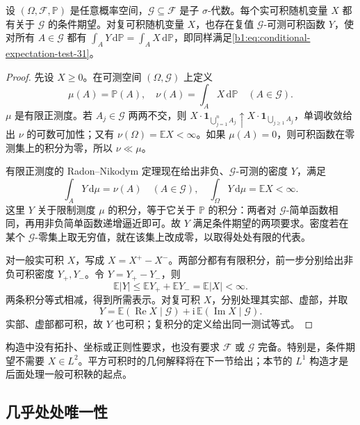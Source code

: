 \begin{theorem}[条件期望的存在性]\label{b1:thm:conditional-expectation-existence-31}
设 \((\Omega,\mathcal F,\mathbb P)\) 是任意概率空间，\(\mathcal G\subseteq\mathcal F\) 是子 \(\sigma\)-代数。每个实可积随机变量 \(X\) 都有关于 \(\mathcal G\) 的条件期望。对复可积随机变量 \(X\)，也存在复值 \(\mathcal G\)-可测可积函数 \(Y\)，使对所有 \(A\in\mathcal G\) 都有 \(\int_A Y\,\mathrm d\mathbb P=\int_A X\,\mathrm d\mathbb P\)，即同样满足\eqref{b1:eq:conditional-expectation-test-31}。
\end{theorem}
\begin{proof}
先设 \(X\geq0\)。在可测空间 \((\Omega,\mathcal G)\) 上定义
\[
 \mu(A)=\mathbb P(A),\quad
 \nu(A)=\int_A X\,\mathrm d\mathbb P
 \quad(A\in\mathcal G).
\]
\(\mu\) 是有限正测度。若 \(A_j\in\mathcal G\) 两两不交，则
\(X\cdot\mathbf1_{\bigcup_{j=1}^nA_j}\uparrow
X\cdot\mathbf1_{\bigcup_{j\geq1}A_j}\)，单调收敛给出 \(\nu\) 的可数可加性；又有 \(\nu(\Omega)=\mathbb E X<\infty\)。如果 \(\mu(A)=0\)，则可积函数在零测集上的积分为零，所以 \(\nu\ll\mu\)。

有限正测度的 Radon--Nikodym 定理现在给出非负、\(\mathcal G\)-可测的密度 \(Y\)，满足
\[
 \int_A Y\,\mathrm d\mu=\nu(A)
 \quad(A\in\mathcal G),\quad
 \int_\Omega Y\,\mathrm d\mu=\mathbb E X<\infty.
\]
这里 \(Y\) 关于限制测度 \(\mu\) 的积分，等于它关于 \(\mathbb P\) 的积分：两者对 \(\mathcal G\)-简单函数相同，再用非负简单函数递增逼近即可。故 \(Y\) 满足条件期望的两项要求。密度若在某个 \(\mathcal G\)-零集上取无穷值，就在该集上改成零，以取得处处有限的代表。

对一般实可积 \(X\)，写成 \(X=X^+-X^-\)。两部分都有有限积分，前一步分别给出非负可积密度 \(Y_+,Y_-\)。令 \(Y=Y_+-Y_-\)，则
\[
 \mathbb E|Y|\leq\mathbb E Y_++\mathbb E Y_-
 =\mathbb E|X|<\infty.
\]
两条积分等式相减，得到所需表示。对复可积 \(X\)，分别处理其实部、虚部，并取
\[
 Y=\mathbb E(\operatorname{Re}X\mid\mathcal G)
 +\mathrm i\,\mathbb E(\operatorname{Im}X\mid\mathcal G).
\]
实部、虚部都可积，故 \(Y\) 也可积；复积分的定义给出同一测试等式。
\end{proof}

构造中没有拓扑、坐标或正则性要求，也没有要求 \(\mathcal F\) 或 \(\mathcal G\) 完备。特别是，条件期望不需要 \(X\in L^2\)。平方可积时的几何解释将在下一节给出；本节的 \(L^1\) 构造才是后面处理一般可积鞅的起点。

\subsection{几乎处处唯一性}
\label{b1:subsec:310103}

